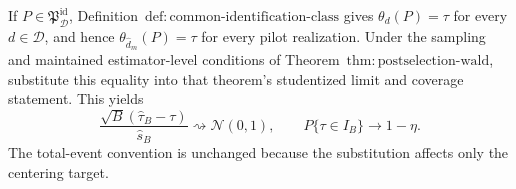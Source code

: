 If \(P\in\mathfrak P_{\mathcal D}^{\mathrm{id}}\), Definition~\(\mathrm{def{:}common\text{-}identification\text{-}class}\) gives \(\theta_d(P)=\tau\) for every \(d\in\mathcal D\), and hence \(\theta_{\widehat d_m}(P)=\tau\) for every pilot realization.  Under the sampling and maintained estimator-level conditions of Theorem~\(\mathrm{thm{:}postselection\text{-}wald}\), substitute this equality into that theorem's studentized limit and coverage statement.  This yields
\[
 \frac{\sqrt B(\widehat\tau_B-\tau)}{\widehat s_B}
 \rightsquigarrow\mathcal N(0,1),
 \qquad
 P\{\tau\in I_B\}\longrightarrow1-\eta.
\]
The total-event convention is unchanged because the substitution affects only the centering target.